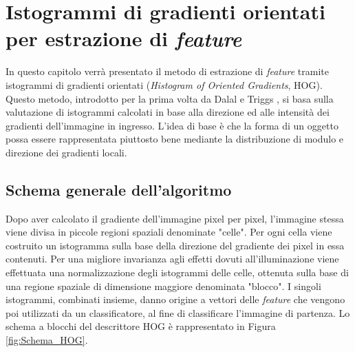 
\chapter{Istogrammi di gradienti orientati per estrazione di \emph{feature}} %
\label{cap:hog}

In questo capitolo verrà presentato il metodo di estrazione di \emph{feature} tramite istogrammi di gradienti orientati (\emph{Histogram of Oriented Gradients}, HOG). Questo metodo, introdotto per la prima volta da Dalal e Triggs \citep{Art_HOGHuman}, si basa sulla valutazione di istogrammi calcolati in base alla direzione ed alle intensità dei gradienti dell'immagine in ingresso. L'idea di base è che la forma di un oggetto possa essere rappresentata piuttosto bene mediante la distribuzione di modulo e direzione dei gradienti locali. 
\clearpage

\section{Schema generale dell'algoritmo}
Dopo aver calcolato il gradiente dell'immagine pixel per pixel, l'immagine stessa viene divisa in piccole regioni spaziali denominate "celle". Per ogni cella viene costruito un istogramma sulla base della direzione del gradiente dei  pixel in essa contenuti. Per una migliore invarianza agli effetti dovuti all'illuminazione viene effettuata una normalizzazione degli istogrammi delle celle, ottenuta sulla base di una regione spaziale di dimensione maggiore denominata "blocco". I singoli istogrammi, combinati insieme, danno origine a vettori delle \emph{feature} che vengono poi utilizzati da un classificatore, al fine di classificare l'immagine di partenza. Lo schema a blocchi del descrittore HOG è rappresentato in Figura \ref{fig:Schema_HOG}.
 \\

